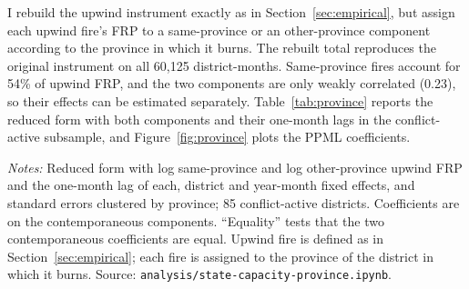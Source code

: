 \documentclass[12pt]{article}
\begin{document}
I rebuild the upwind instrument exactly as in Section~\ref{sec:empirical}, but assign each upwind fire's FRP to a same-province or an other-province component according to the province in which it burns. The rebuilt total reproduces the original instrument on all 60,125 district-months. Same-province fires account for 54\% of upwind FRP, and the two components are only weakly correlated (0.23), so their effects can be estimated separately. Table~\ref{tab:province} reports the reduced form with both components and their one-month lags in the conflict-active subsample, and Figure~\ref{fig:province} plots the PPML coefficients.

\begin{table}[htbp]
\centering
\caption{Same-province and other-province upwind fire (conflict-active districts)}
\label{tab:province}
\begin{minipage}{0.95\textwidth}
\footnotesize \textit{Notes:} Reduced form with log same-province and log other-province upwind FRP and the one-month lag of each, district and year-month fixed effects, and standard errors clustered by province; 85 conflict-active districts. Coefficients are on the contemporaneous components. ``Equality'' tests that the two contemporaneous coefficients are equal. Upwind fire is defined as in Section~\ref{sec:empirical}; each fire is assigned to the province of the district in which it burns. Source: \texttt{analysis/state-capacity-province.ipynb}.
\end{minipage}
\end{table}
\end{document}
